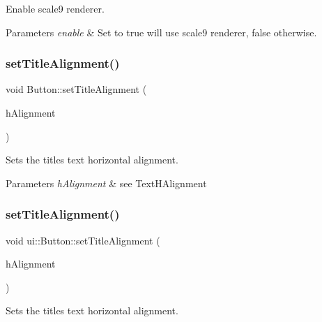 Enable scale9 renderer.


\begin{DoxyParams}{Parameters}
{\em enable} & Set to true will use scale9 renderer, false otherwise. \\
\hline
\end{DoxyParams}
\mbox{\label{classui_1_1Button_a81ffbdbc79f95c16cda107123ce4d621}} 
\subsubsection{\texorpdfstring{set\+Title\+Alignment()}{setTitleAlignment()}\hspace{0.1cm}{\footnotesize\ttfamily [1/4]}}
{\footnotesize\ttfamily void Button\+::set\+Title\+Alignment (\begin{DoxyParamCaption}\item[{Text\+H\+Alignment}]{h\+Alignment }\end{DoxyParamCaption})}

Sets the title\textquotesingle{}s text horizontal alignment.


\begin{DoxyParams}{Parameters}
{\em h\+Alignment} & see Text\+H\+Alignment \\
\hline
\end{DoxyParams}
\mbox{\label{classui_1_1Button_ade7fbe8fe353d065bdcbfcaaffdfde06}} 
\subsubsection{\texorpdfstring{set\+Title\+Alignment()}{setTitleAlignment()}\hspace{0.1cm}{\footnotesize\ttfamily [2/4]}}
{\footnotesize\ttfamily void ui\+::\+Button\+::set\+Title\+Alignment (\begin{DoxyParamCaption}\item[{Text\+H\+Alignment}]{h\+Alignment }\end{DoxyParamCaption})}

Sets the title\textquotesingle{}s text horizontal alignment.


